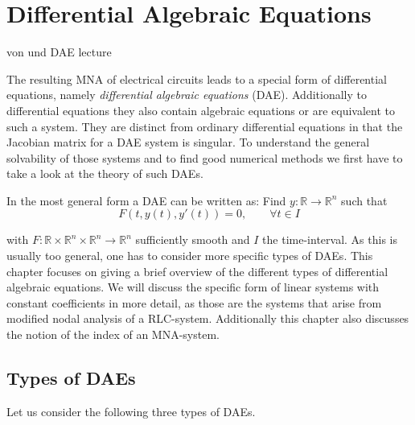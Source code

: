 \chapter{Differential Algebraic Equations}

von \cite{NumerikGewöhnlicherDifferentialgleichungen} und DAE lecture

The resulting MNA of electrical circuits leads to a special form of differential equations, namely \emph{differential algebraic equations} (DAE). Additionally to differential equations they also contain algebraic equations or are equivalent to such a system. They are distinct from ordinary differential equations in that the Jacobian matrix for a DAE system is singular. 
To understand the general solvability of those systems and to find good numerical methods we first have to take a look at the theory of such DAEs.

In the most general form a DAE can be written as:
Find $y:\mathbb{R} \to \mathbb{R}^n$ such that
\begin{equation}
	\label{Abstract_DAE}
	F(t, y(t), y'(t)) = 0, \qquad \forall t \in I
\end{equation}

with $F:\mathbb{R} \times \mathbb{R}^n \times \mathbb{R}^n \to \mathbb{R}^n$ sufficiently smooth and $I$ the time-interval. As this is usually too general, one has to consider more specific types of DAEs.
This chapter focuses on giving a brief overview of the different types of differential algebraic equations. We will discuss the specific form of linear systems with constant coefficients in more detail, as those are the systems that arise from modified nodal analysis of a RLC-system. Additionally this chapter also discusses the notion of the index of an MNA-system.

\section{Types of DAEs}

	Let us consider the following three types of DAEs.
	
